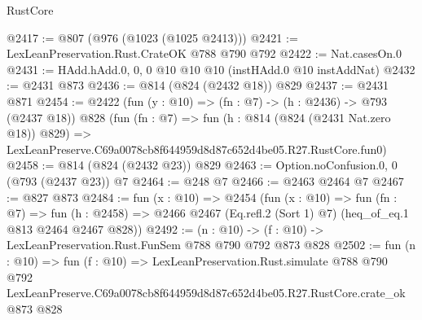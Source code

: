 \begin{lexlean}{RustCore}
\begin{coremodule}
@2417 := @807 (@976 (@1023 (@1025 @2413)))
@2421 := LexLeanPreservation.Rust.CrateOK @788 @790 @792
@2422 := Nat.casesOn.{0}
@2431 := HAdd.hAdd.{0, 0, 0} @10 @10 @10 (instHAdd.{0} @10 instAddNat)
@2432 := @2431 @873
@2436 := @814 (@824 (@2432 @18)) @829
@2437 := @2431 @871
@2454 := @2422
    (fun (y : @10) => (fn : @7) -> (h : @2436) -> @793 (@2437 @18))
    @828
    (fun (fn : @7) =>
    fun (h : @814 (@824 (@2431 Nat.zero @18)) @829) =>
    LexLeanPreserve.C69a0078cb8f644959d8d87c652d4be05.R27.RustCore.fun0)
@2458 := @814 (@824 (@2432 @23)) @829
@2463 := Option.noConfusion.{0, 0} (@793 (@2437 @23)) @7
@2464 := @248 @7
@2466 := @2463 @2464 @7
@2467 := @827 @873
@2484 := fun (x : @10) =>
  @2454
    (fun (x : @10) =>
    fun (fn : @7) =>
    fun (h : @2458) => @2466 @2467 (Eq.refl.{2} (Sort 1) @7) (heq_of_eq.{1} @813 @2464 @2467 @828))
@2492 := (n : @10) -> (f : @10) -> LexLeanPreservation.Rust.FunSem @788 @790 @792 @873 @828
@2502 := fun (n : @10) =>
  fun (f : @10) =>
  LexLeanPreservation.Rust.simulate
    @788
    @790
    @792
    LexLeanPreserve.C69a0078cb8f644959d8d87c652d4be05.R27.RustCore.crate_ok
    @873
    @828
\end{coremodule}
\end{lexlean}
